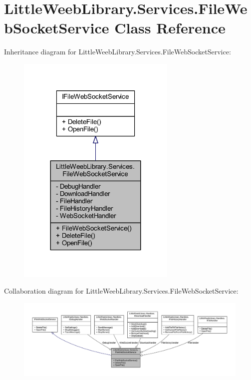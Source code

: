 \hypertarget{class_little_weeb_library_1_1_services_1_1_file_web_socket_service}{}\section{Little\+Weeb\+Library.\+Services.\+File\+Web\+Socket\+Service Class Reference}
\label{class_little_weeb_library_1_1_services_1_1_file_web_socket_service}


Inheritance diagram for Little\+Weeb\+Library.\+Services.\+File\+Web\+Socket\+Service\+:\nopagebreak
\begin{figure}[H]
\begin{center}
\leavevmode
\includegraphics[width=215pt]{class_little_weeb_library_1_1_services_1_1_file_web_socket_service__inherit__graph}
\end{center}
\end{figure}


Collaboration diagram for Little\+Weeb\+Library.\+Services.\+File\+Web\+Socket\+Service\+:\nopagebreak
\begin{figure}[H]
\begin{center}
\leavevmode
\includegraphics[width=350pt]{class_little_weeb_library_1_1_services_1_1_file_web_socket_service__coll__graph}
\end{center}
\end{figure}
